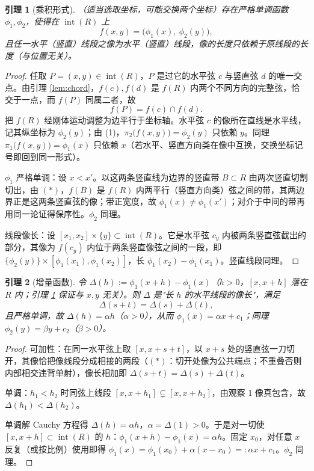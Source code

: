 \documentclass[12pt,a4paper]{ctexart}
\theoremstyle{ding}
\newtheorem{lemma}{引理}[section]
\theoremstyle{definition}
\renewcommand{\int}{\operatorname{int}}
\begin{document}
\begin{lemma}[乘积形式]\label{lem:prod}
（适当选取坐标，可能交换两个坐标）存在严格单调函数 $\phi_1,\phi_2$，使得在 $\int(R)$ 上
\[
f(x,y)=\bigl(\phi_1(x),\ \phi_2(y)\bigr),
\]
且任一水平（竖直）线段之像为水平（竖直）线段，像的长度只依赖于原线段的长度（与位置无关）。
\end{lemma}
\begin{proof}
任取 $P=(x,y)\in\int(R)$，$P$ 是过它的水平弦 $c$ 与竖直弦 $d$ 的唯一交点。由引理 \ref{lem:chord}，$f(c),f(d)$ 是 $f(R)$ 内两个不同方向的完整弦，恰交于一点，而 $f(P)$ 同属二者，故
\[
f(P)=f(c)\cap f(d).\tag{1}
\]
把 $f(R)$ 经刚体运动调整为边平行于坐标轴。水平弦 $c$ 的像所在直线是水平线，记其纵坐标为 $\phi_2(y)$；由 (1)，$\pi_2\bigl(f(x,y)\bigr)=\phi_2(y)$ 只依赖 $y$。同理 $\pi_1\bigl(f(x,y)\bigr)=\phi_1(x)$ 只依赖 $x$（若水平、竖直方向类在像中互换，交换坐标记号即回到同一形式）。

$\phi_1$ 严格单调：设 $x<x'$。以这两条竖直线为边界的竖直带 $B\subset R$ 由两次竖直切割切出，由 $(*)$，$f(B)$ 是 $f(R)$ 内两平行（竖直方向类）弦之间的带，其两边界正是这两条竖直弦的像；带正宽度，故 $\phi_1(x)\neq\phi_1(x')$；对介于中间的带再用同一论证得保序性。$\phi_2$ 同理。

线段像长：设 $[x_1,x_2]\times\{y\}\subset\int(R)$。它是水平弦 $c_y$ 内被两条竖直弦截出的部分，其像为 $f(c_y)$ 内位于两条竖直像弦之间的一段，即 $\{\phi_2(y)\}\times[\phi_1(x_1),\phi_1(x_2)]$，长 $\phi_1(x_2)-\phi_1(x_1)$。竖直线段同理。
\end{proof}

\begin{lemma}[增量函数]\label{lem:Delta}
令 $\Delta(h):=\phi_1(x+h)-\phi_1(x)$（$h>0$，$[x,x+h]$ 落在 $R$ 内；引理 \ref{lem:prod} 保证与 $x,y$ 无关）。则 $\Delta$ 是"长 $h$ 的水平线段的像长"，满足
\[
\Delta(s+t)=\Delta(s)+\Delta(t),
\]
且严格单调，故 $\Delta(h)=\alpha h$（$\alpha>0$），从而 $\phi_1(x)=\alpha x+c_1$；同理 $\phi_2(y)=\beta y+c_2$（$\beta>0$）。
\end{lemma}
\begin{proof}
可加性：在同一水平弦上取 $[x,x+s+t]$，以 $x+s$ 处的竖直弦一刀切开，其像恰把像线段分成相接的两段（$(*)$：切开处像为公共端点；不重叠否则内部相交违背单射），像长相加即 $\Delta(s+t)=\Delta(s)+\Delta(t)$。

单调：$h_1<h_2$ 时同弦上线段 $[x,x+h_1]\subsetneq[x,x+h_2]$，由观察 1 像真包含，故 $\Delta(h_1)<\Delta(h_2)$。

单调解 Cauchy 方程得 $\Delta(h)=\alpha h$，$\alpha=\Delta(1)>0$。于是对一切使 $[x,x+h]\subset\int(R)$ 的 $h$：$\phi_1(x+h)-\phi_1(x)=\alpha h$。固定 $x_0$，对任意 $x$ 反复（或按比例）使用即得 $\phi_1(x)=\phi_1(x_0)+\alpha(x-x_0)=:\alpha x+c_1$。$\phi_2$ 同理。
\end{proof}
\end{document}
